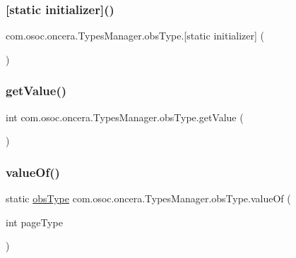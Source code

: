 \subsubsection{\texorpdfstring{[static initializer]()}{[static initializer]()}}
{\footnotesize\ttfamily com.\+osoc.\+oncera.\+Types\+Manager.\+obs\+Type.\mbox{[}static initializer\mbox{]} (\begin{DoxyParamCaption}{ }\end{DoxyParamCaption})\hspace{0.3cm}{\ttfamily [static]}}

\mbox{\label{enumcom_1_1osoc_1_1oncera_1_1_types_manager_1_1obs_type_a4a1abd4f74252621de532a0ec1991b0e}} 
\subsubsection{\texorpdfstring{getValue()}{getValue()}}
{\footnotesize\ttfamily int com.\+osoc.\+oncera.\+Types\+Manager.\+obs\+Type.\+get\+Value (\begin{DoxyParamCaption}{ }\end{DoxyParamCaption})}

\mbox{\label{enumcom_1_1osoc_1_1oncera_1_1_types_manager_1_1obs_type_ae37356fab18860f341ca57d7b97a4b55}} 
\subsubsection{\texorpdfstring{valueOf()}{valueOf()}}
{\footnotesize\ttfamily static \mbox{\hyperlink{enumcom_1_1osoc_1_1oncera_1_1_types_manager_1_1obs_type}{obs\+Type}} com.\+osoc.\+oncera.\+Types\+Manager.\+obs\+Type.\+value\+Of (\begin{DoxyParamCaption}\item[{int}]{page\+Type }\end{DoxyParamCaption})\hspace{0.3cm}{\ttfamily [static]}}



